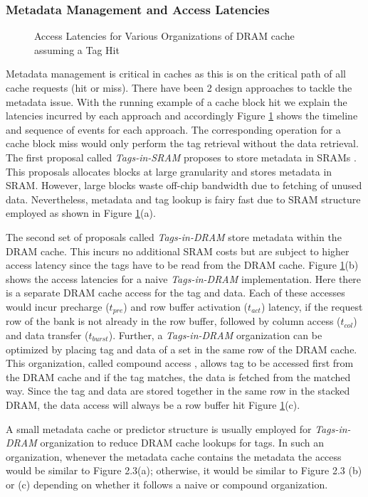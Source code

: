 \subsubsection{Metadata Management and Access Latencies}
\begin{figure}[!htb]
	\centering
	\def\svgwidth{\columnwidth}
	
	\caption{Access Latencies for Various Organizations of DRAM cache assuming a Tag Hit}
	\label{fig:dramcache-lat}
\end{figure}
Metadata management is critical in caches as this is on the critical path of all cache requests (hit or miss). There have been 2 design approaches to tackle the metadata issue. With the running example of a cache block hit we explain the latencies incurred by each approach and accordingly Figure \ref{fig:dramcache-lat} shows the timeline and sequence of events for each approach. The corresponding operation for a cache block miss would only perform the tag retrieval without the data retrieval. The first proposal called \textit{Tags-in-SRAM} proposes to store metadata in SRAMs \cite{footprint}. This proposals allocates blocks at large granularity and stores metadata in SRAM. However, large blocks waste off-chip bandwidth due to fetching of unused data. Nevertheless, metadata and tag lookup is fairy fast due to SRAM structure employed as shown in Figure \ref{fig:dramcache-lat}(a). 
\par The second set of proposals called \textit{Tags-in-DRAM} \cite{loh-hill,alloy,bimodal,atcache} store metadata within the DRAM cache. This incurs no additional SRAM costs but are subject to higher access latency since the tags have to be read from the DRAM cache. Figure \ref{fig:dramcache-lat}(b) shows the access latencies for a naive \textit{Tags-in-DRAM} implementation. Here there is a separate DRAM cache access for the tag and data. Each of these accesses would incur precharge ($t_{pre}$) and row buffer activation ($t_{act}$) latency, if the request row of the bank is not already in the row buffer, followed by column access ($t_{col}$) and data transfer ($t_{burst}$). Further, a \textit{Tags-in-DRAM} organization can be optimized by placing tag and data of a set in the same row of the DRAM cache. This organization, called compound access \cite{loh-hill}, allows tag to be accessed first from the DRAM cache and if the tag matches, the data is fetched from the matched way. Since the tag and data are stored together in the same row in the stacked DRAM, the data access will always be a row buffer hit Figure \ref{fig:dramcache-lat}(c). 
\par A small metadata cache \cite{atcache} or predictor \cite{loh-hill} structure is usually employed for \textit{Tags-in-DRAM} organization to reduce DRAM cache lookups for tags. In such an organization, whenever the metadata cache contains the metadata the access would be similar to Figure 2.3(a); otherwise, it would be similar to Figure 2.3 (b) or (c) depending on whether it follows a naive or compound organization. 

